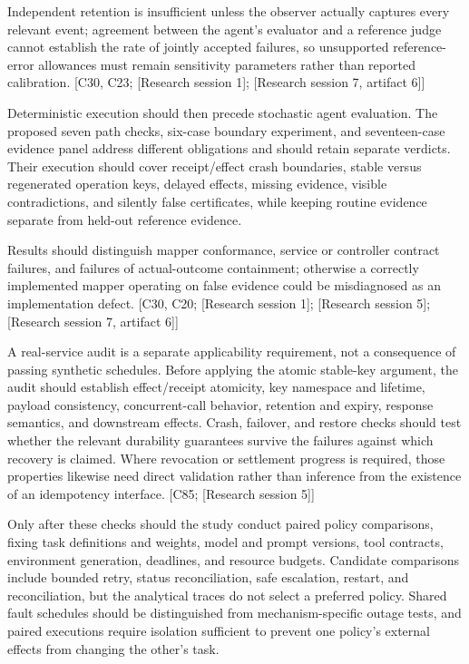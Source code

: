 \documentclass[11pt]{article}
\begin{document}
Independent retention is insufficient unless the observer actually captures every relevant event; agreement between the agent's evaluator and a reference judge cannot establish the rate of jointly accepted failures, so unsupported reference-error allowances must remain sensitivity parameters rather than reported calibration. [C30, C23; [Research session 1]; [Research session 7, artifact 6]]

Deterministic execution should then precede stochastic agent evaluation. The proposed seven path checks, six-case boundary experiment, and seventeen-case evidence panel address different obligations and should retain separate verdicts. Their execution should cover receipt/effect crash boundaries, stable versus regenerated operation keys, delayed effects, missing evidence, visible contradictions, and silently false certificates, while keeping routine evidence separate from held-out reference evidence.

Results should distinguish mapper conformance, service or controller contract failures, and failures of actual-outcome containment; otherwise a correctly implemented mapper operating on false evidence could be misdiagnosed as an implementation defect. [C30, C20; [Research session 1]; [Research session 5]; [Research session 7, artifact 6]]

A real-service audit is a separate applicability requirement, not a consequence of passing synthetic schedules. Before applying the atomic stable-key argument, the audit should establish effect/receipt atomicity, key namespace and lifetime, payload consistency, concurrent-call behavior, retention and expiry, response semantics, and downstream effects. Crash, failover, and restore checks should test whether the relevant durability guarantees survive the failures against which recovery is claimed. Where revocation or settlement progress is required, those properties likewise need direct validation rather than inference from the existence of an idempotency interface. [C85; [Research session 5]]

Only after these checks should the study conduct paired policy comparisons, fixing task definitions and weights, model and prompt versions, tool contracts, environment generation, deadlines, and resource budgets. Candidate comparisons include bounded retry, status reconciliation, safe escalation, restart, and reconciliation, but the analytical traces do not select a preferred policy. Shared fault schedules should be distinguished from mechanism-specific outage tests, and paired executions require isolation sufficient to prevent one policy's external effects from changing the other's task.
\end{document}
